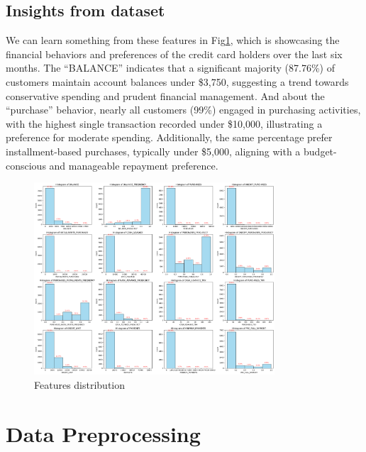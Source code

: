 \documentclass{article}
\begin{document}
\subsection{Insights from dataset}
We can learn something from these features in Fig\ref{fig:insight}, which is showcasing the financial behaviors and preferences of the credit card holders over the last six months. The ``BALANCE'' indicates that a significant majority (87.76\%) of customers maintain account balances under \$3,750, suggesting a trend towards conservative spending and prudent financial management. And about the ``purchase'' behavior, nearly all customers (99\%) engaged in purchasing activities, with the highest single transaction recorded under \$10,000, illustrating a preference for moderate spending. Additionally, the same percentage prefer installment-based purchases, typically under \$5,000, aligning with a budget-conscious and manageable repayment preference.
\begin{figure}[hbt!]
    \centering
    \includegraphics[width=0.8\textwidth]{fig/zya/insight from data.png}
    \caption{Features distribution}
    \label{fig:insight}  %
\end{figure}

\section{Data Preprocessing}
\end{document}
